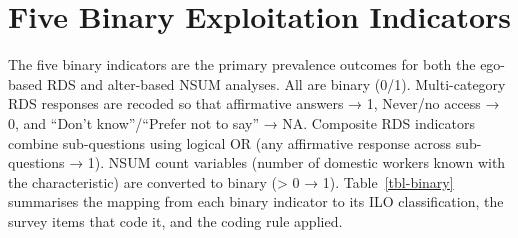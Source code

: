 \documentclass[
  12pt,
  letterpaper,
  DIV=11,
  numbers=noendperiod]{scrreprt}
\begin{document}
\section{Five Binary Exploitation Indicators}\label{sec-a-binary}

The five binary indicators are the primary prevalence outcomes for both
the ego-based RDS and alter-based NSUM analyses. All are binary (0/1).
Multi-category RDS responses are recoded so that affirmative answers →
1, Never/no access → 0, and ``Don't know''/``Prefer not to say'' → NA.
Composite RDS indicators combine sub-questions using logical OR (any
affirmative response across sub-questions → 1). NSUM count variables
(number of domestic workers known with the characteristic) are converted
to binary (\textgreater{} 0 → 1). Table~\ref{tbl-binary} summarises the
mapping from each binary indicator to its ILO classification, the survey
items that code it, and the coding rule applied.
\end{document}
